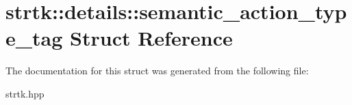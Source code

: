 \hypertarget{structstrtk_1_1details_1_1semantic__action__type__tag}{\section{strtk\-:\-:details\-:\-:semantic\-\_\-action\-\_\-type\-\_\-tag Struct Reference}
\label{structstrtk_1_1details_1_1semantic__action__type__tag}
}


The documentation for this struct was generated from the following file\-:\begin{DoxyCompactItemize}
\item 
strtk.\-hpp\end{DoxyCompactItemize}
